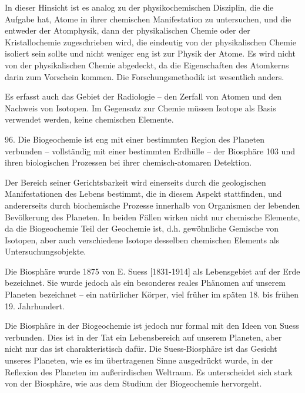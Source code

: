 \documentclass[11pt,a4paper]{book}
\begin{document}
In dieser Hinsicht ist es analog zu der physikochemischen Disziplin, die die Aufgabe hat, Atome in ihrer chemischen Manifestation zu untersuchen, und die entweder der Atomphysik, dann der physikalischen Chemie oder der Kristallochemie zugeschrieben wird, die eindeutig von der physikalischen Chemie isoliert sein sollte und nicht weniger eng ist zur Physik der Atome. Es wird nicht von der physikalischen Chemie abgedeckt, da die Eigenschaften des Atomkerns darin zum Vorschein kommen. Die Forschungsmethodik ist wesentlich anders.



Es erfasst auch das Gebiet der Radiologie -- den Zerfall von Atomen und den Nachweis von Isotopen. Im Gegensatz zur Chemie müssen Isotope als Basis verwendet werden, keine chemischen Elemente.



96. Die Biogeochemie ist eng mit einer bestimmten Region des Planeten verbunden -- vollständig mit einer bestimmten Erdhülle -- der Biosphäre 103 und ihren biologischen Prozessen bei ihrer chemisch-atomaren Detektion.



Der Bereich seiner Gerichtsbarkeit wird einerseits durch die geologischen Manifestationen des Lebens bestimmt, die in diesem Aspekt stattfinden, und andererseits durch biochemische Prozesse innerhalb von Organismen der lebenden Bevölkerung des Planeten. In beiden Fällen wirken nicht nur chemische Elemente, da die Biogeochemie Teil der Geochemie ist, d.h. gewöhnliche Gemische von Isotopen, aber auch verschiedene Isotope desselben chemischen Elements als Untersuchungsobjekte.



Die Biosphäre wurde 1875 von E. Suess [1831-1914] als Lebensgebiet auf der Erde bezeichnet. Sie wurde jedoch als ein besonderes reales Phänomen auf unserem Planeten bezeichnet -- ein natürlicher Körper, viel früher im späten 18. bis frühen 19. Jahrhundert.



Die Biosphäre in der Biogeochemie ist jedoch nur formal mit den Ideen von Suess verbunden. Dies ist in der Tat ein Lebensbereich auf unserem Planeten, aber nicht nur das ist charakteristisch dafür. Die Suess-Biosphäre ist das Gesicht unseres Planeten, wie es im übertragenen Sinne ausgedrückt wurde, in der Reflexion des Planeten im außerirdischen Weltraum. Es unterscheidet sich stark von der Biosphäre, wie aus dem Studium der Biogeochemie hervorgeht.
\end{document}
